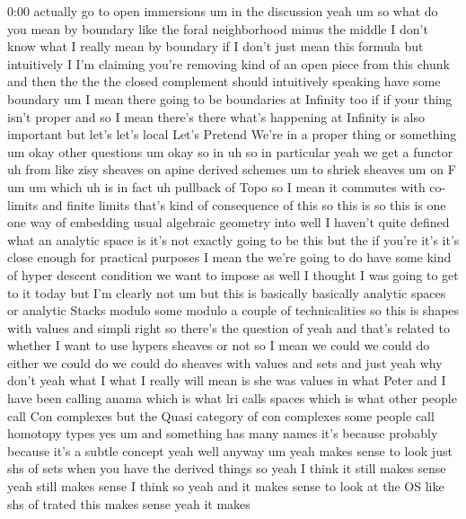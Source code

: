 \begin{unfinished}{0:00}
actually  go  to  open  immersions  um  in  the
discussion
yeah
um
so  what  do  you  mean  by  boundary  like  the
foral  neighborhood  minus  the
middle  I  don't  know  what  I  really  mean
by  boundary  if  I  don't  just  mean  this
formula  but  intuitively  I  I'm  claiming
you're  removing  kind  of  an  open  piece
from  this  chunk  and  then  the  the  the
closed  complement  should  intuitively
speaking  have  some  boundary
um  I  mean  there  going  to  be  boundaries
at  Infinity  too  if  if  your  thing  isn't
proper  and  so  I  mean  there's  there
what's  happening  at  Infinity  is  also
important  but  let's  let's  local  Let's
Pretend  We're  in  a  proper  thing  or
something
um  okay  other
questions
um
okay
so  in  uh  so  in  particular
yeah  we  get  a
functor  uh
from  like  zisy  sheaves  on  apine  derived
schemes  um  to  shriek  sheaves  um  on
F
um  um  which  uh  is  in
fact  uh  pullback  of
Topo  so  I  mean  it  commutes  with  co-
limits  and  finite  limits  that's  kind  of
consequence  of  this  so  this  is  so  this
is  one  one  way  of  embedding  usual
algebraic  geometry  into  well  I  haven't
quite  defined  what  an  analytic  space  is
it's  not  exactly  going  to  be  this  but
the
if
you're  it's  it's  close  enough  for
practical  purposes  I  mean  the  we're
going  to  do  have  some  kind  of  hyper
descent  condition  we  want  to  impose  as
well  I  thought  I  was  going  to  get  to  it
today  but  I'm  clearly  not  um  but  this  is
basically  basically  analytic  spaces  or
analytic
Stacks  modulo  some  modulo  a  couple  of
technicalities  so  this  is  shapes  with
values  and  simpli  right  so  there's  the
question  of  yeah  and  that's  related  to
whether  I  want  to  use
hypers  sheaves  or  not  so  I  mean  we
could  we  could  do  either  we  could  do  we
could  do  sheaves  with  values  and  sets
and
just  yeah  why  don't  yeah  what  I  what  I
really  will  mean  is  she  was  values
in  what  Peter  and  I  have  been  calling
anama  which  is  what  lri  calls  spaces
which  is  what  other  people  call  Con
complexes  but  the  Quasi  category  of  con
complexes  some  people  call  homotopy
types  yes
um
and  something  has  many  names  it's
because  probably  because  it's  a  subtle
concept  yeah  well
anyway
um  yeah  makes  sense  to  look  just  shs  of
sets  when  you  have  the  derived  things  so
yeah  I  think  it  still  makes  sense  yeah
still  makes  sense  I  think  so  yeah  and  it
makes  sense  to  look  at  the  OS  like  shs
of
trated  this  makes  sense  yeah  it  makes

\end{unfinished}
